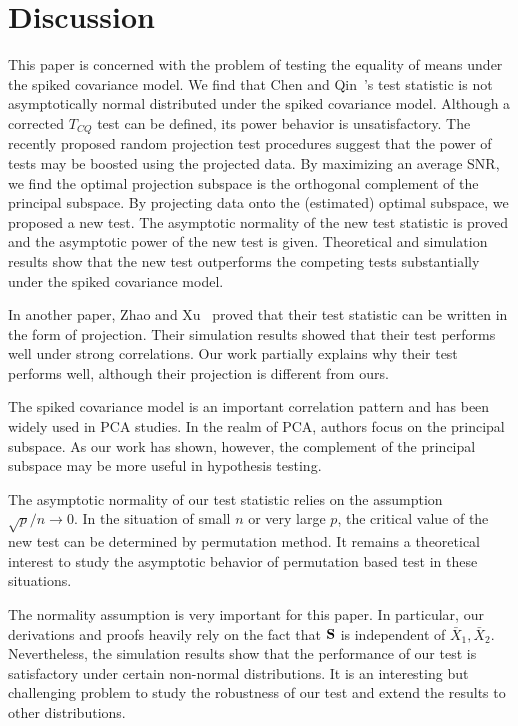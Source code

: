 \documentclass[times,sort&compress,3p]{elsarticle}
\theoremstyle{plain}
\theoremstyle{definition}
\theoremstyle{remark}
\begin{document}
\section{Discussion}



This paper is concerned with the problem of testing the equality of means under the spiked covariance model.
We find that Chen and Qin~\cite{Chen2010A}'s test statistic is not asymptotically normal distributed under the spiked covariance model. 
Although a corrected $T_{CQ}$ test can be defined, its power behavior is unsatisfactory.
The recently proposed random projection test procedures suggest that the power of tests may be boosted using the projected data.
By maximizing an average SNR, we find the optimal projection subspace is the orthogonal complement of the principal subspace.
By projecting data onto the (estimated) optimal subspace, we proposed a new test.
The asymptotic normality of the new test statistic is proved and the asymptotic power of the new test is given.
    Theoretical and simulation results show that the new test outperforms the competing tests substantially under the spiked covariance model.


In another paper, Zhao and Xu~\cite{Zhao2016A} proved that their test statistic can be written in the form of projection. Their simulation results showed that their test performs well under strong correlations.
Our work partially explains why their test performs well, although their projection is different from ours. 

 The spiked covariance model is an important correlation pattern and has been widely used in PCA studies.
 In the realm of PCA, authors focus on the principal subspace.
 As our work has shown, however, the complement of the principal subspace may be more useful in hypothesis testing. 


The asymptotic normality of our test statistic relies on the assumption $\sqrt{p}/n\to 0$. In the situation of small $n$ or very large $p$, the critical value of the new test can be determined by permutation method. It remains a theoretical interest to study the asymptotic behavior of permutation based test in these situations.

The normality assumption is very important for this paper.
In particular, our derivations and proofs heavily rely on the fact that $\mathbf{S}$ is independent of $\bar{X}_1,\bar{X}_2$.
Nevertheless, the simulation results show that the performance of our test is satisfactory under certain non-normal distributions.
It is an interesting but challenging problem to study the robustness of our test and extend the results to other distributions.
\end{document}
